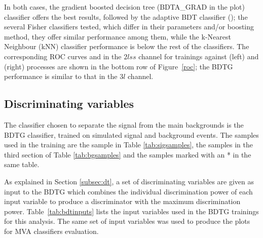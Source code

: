 In both cases, the gradient boosted decision tree  (BDTA\_GRAD in the plot) classifier offers the best results, followed by the adaptive BDT classifier (); the several Fisher classifiers tested, which differ in their parameters and/or boosting method, they offer similar performance among them, while the k-Nearest Neighbour (kNN) classifier performance is below the rest of the classifiers. The corresponding ROC curves and in the $2lss$ channel for trainings against \ttV (left) and \ttbar (right) processes are shown in the bottom row of Figure~\ref{roc}; the BDTG performance is similar to that in the $3l$ channel.

\subsection{Discriminating variables}

The classifier chosen to separate the \tHq signal from the main backgrounds is the BDTG classifier, trained on simulated signal and background events. The samples used in the training are the \tHq sample in Table \ref{tab:sigsamples}, the samples in the third section of Table \ref{tab:bgsamples} and the samples marked with an * in the same table.

As explained in Section \ref{subsec:dt}, a set of discriminating variables are given as input to the BDTG which combines the individual discrimination power of each input variable to produce a discriminator with the maximum discrimination power. Table~\ref{tab:bdtinputs} lists the input variables used in the BDTG trainings for this analysis. The same set of input variables was used to produce the plots for MVA classifiers evaluation. 

